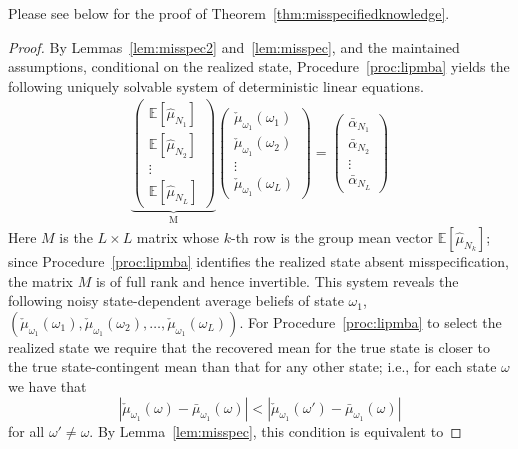 \documentclass[12pt,reqno]{amsart}
\begin{document}
Please see below for the proof of Theorem~\ref{thm:misspecifiedknowledge}.
\begin{proof}
By Lemmas~\ref{lem:misspec2} and~\ref{lem:misspec}, and the maintained assumptions, conditional on the realized state, Procedure~\ref{proc:lipmba} yields the following uniquely solvable system of deterministic linear equations.
\begin{align}
 \underbrace{\left( \begin{array}{c} \mathbb{E}[\hat{\mu}_{N_1}]\\ \mathbb{E}[\hat{\mu}_{N_2}] \\ \vdots\\ \mathbb{E}[\hat{\mu}_{N_L}]\end{array}\right)}_{\text{M}}  \left( \begin{array}{c} \check{\mu}_{\omega_1}(\omega_1)\\ \check{\mu}_{\omega_1}(\omega_2) \\ \vdots\\ \check{\mu}_{\omega_1}(\omega_L)\end{array}\right)  = 
    \left( \begin{array}{c} \bar{\alpha}_{N_1} \\ \bar{\alpha}_{N_2} \\ \vdots\\ \bar{\alpha}_{N_L}
    \end{array}     \right) \label{eqn:mainstep4misspec}
    \end{align}
Here $M$ is the $L\times L$ matrix whose $k$-th row is the group mean vector $\mathbb{E}[\hat{\mu}_{N_k}]$; since Procedure~\ref{proc:lipmba} identifies the realized state absent misspecification, the matrix $M$ is of full rank and hence invertible. This system reveals the following noisy state-dependent average beliefs of state $\omega_1$, $(\check{\mu}_{\omega_1}(\omega_1), \check{\mu}_{\omega_1}(\omega_2), \ldots, \check{\mu}_{\omega_1}(\omega_L))$. For Procedure~\ref{proc:lipmba} to select the realized state we require that the recovered mean for the true state is closer to the true state-contingent mean than that for any other state; i.e., for each state $\omega$ we have that
\begin{equation*}
    \left\vert \check{\mu}_{\omega_1}(\omega)-\bar{\mu}_{\omega_1}(\omega )\right\vert <\left\vert 
\check{\mu}_{\omega_1}(\omega')-\bar{\mu}_{\omega_1}(\omega )\right\vert 
\end{equation*}
for all $\omega' \neq \omega$.
By Lemma~\ref{lem:misspec}, this condition is equivalent to

\end{proof}
\end{document}
